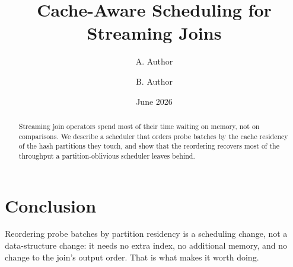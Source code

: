 \documentclass[11pt]{article}
\title{Cache-Aware Scheduling for Streaming Joins}
\author{A. Author \and B. Author}
\date{June 2026}
\begin{document}
\maketitle

\begin{abstract}
Streaming join operators spend most of their time waiting on memory, not
on comparisons. We describe a scheduler that orders probe batches by the
cache residency of the hash partitions they touch, and show that the
reordering recovers most of the throughput a partition-oblivious
scheduler leaves behind.
\end{abstract}







\section{Conclusion}
\label{sec:conclusion}

Reordering probe batches by partition residency is a scheduling change,
not a data-structure change: it needs no extra index, no additional
memory, and no change to the join's output order. That is what makes it
worth doing.



\end{document}
